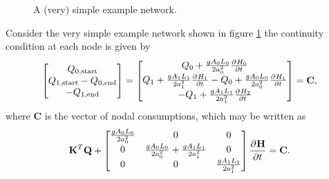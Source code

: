 \begin{figure}
\centering
{} 
\caption{A (very) simple example network.}
\label{fig:discrete_calculus_example_network}
\end{figure}

Consider the very simple example network shown in figure \ref{fig:discrete_calculus_example_network} the continuity condition at each node is given by 
\begin{align*}
\begin{bmatrix}
Q_{0,\text{start}} \\ Q_{1,\text{start}} - Q_{0,\text{end}} \\ -Q_{1,\text{end}}
\end{bmatrix} = \begin{bmatrix}
Q_0 + \frac{gA_0 L_0}{2 a_0^2} \frac{\partial^{} H_0}{\partial t^{}} \\
Q_1 + \frac{gA_1 L_1}{2 a_1^2} \frac{\partial^{} H_1}{\partial t^{}} - Q_0 + \frac{gA_0 L_0}{2 a_0^2} \frac{\partial^{} H_1}{\partial t^{}} \\
-Q_1 + \frac{gA_1 L_1}{2 a_1^2} \frac{\partial^{} H_2}{\partial t^{}}
\end{bmatrix} = \mathbf{C},
\end{align*}
where $\mathbf{C}$ is the vector of nodal consumptions, which may be written as
\begin{align*}
\mathbf{K}^T \mathbf{Q} + \begin{bmatrix}
\frac{gA_0 L_0}{2 a_0^2} & 0 & 0 \\
0 & \frac{gA_0 L_0}{2 a_0^2} + \frac{gA_1 L_1}{2 a_1^2} & 0 \\
0 & 0 & \frac{gA_1 L_1}{2 a_1^2}
\end{bmatrix}
\frac{\partial^{} \mathbf{H}}{\partial t^{}} = \mathbf{C}.
\end{align*}

